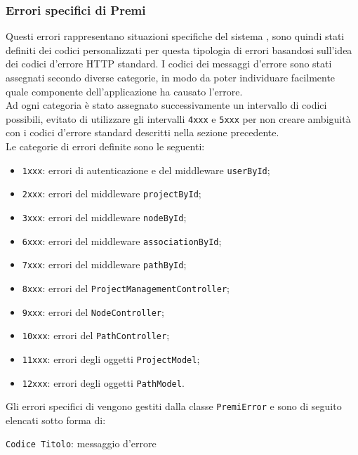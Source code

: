 \subsubsection{Errori specifici di Premi}
Questi errori rappresentano situazioni specifiche del sistema \progetto, sono quindi stati definiti dei codici personalizzati per questa tipologia di errori basandosi sull'idea dei codici d'errore HTTP standard.
I codici dei messaggi d'errore sono stati assegnati secondo diverse categorie, in modo da poter individuare facilmente quale componente dell'applicazione ha causato l'errore.\\
Ad ogni categoria è stato assegnato successivamente un intervallo di codici possibili, evitato di utilizzare gli intervalli \texttt{4xxx} e \texttt{5xxx} per non creare ambiguità con i codici d'errore standard descritti nella sezione precedente.\\
Le categorie di errori definite sono le seguenti:
\begin{itemize}
\item \texttt{1xxx}: errori di autenticazione e del middleware \texttt{userById};
\item \texttt{2xxx}: errori del middleware \texttt{projectById};
\item \texttt{3xxx}: errori del middleware \texttt{nodeById};
\item \texttt{6xxx}: errori del middleware \texttt{associationById};
\item \texttt{7xxx}: errori del middleware \texttt{pathById};
\item \texttt{8xxx}: errori del  \texttt{ProjectManagementController};
\item \texttt{9xxx}: errori del  \texttt{NodeController};
\item \texttt{10xxx}: errori del  \texttt{PathController};
\item \texttt{11xxx}: errori degli oggetti \texttt{ProjectModel};
\item \texttt{12xxx}: errori degli oggetti \texttt{PathModel}.
\end{itemize}
Gli errori specifici di \progetto vengono gestiti dalla classe \texttt{PremiError} e sono di seguito elencati sotto forma di:
\begin{center}
\texttt{Codice Titolo}: messaggio d'errore
\end{center}
